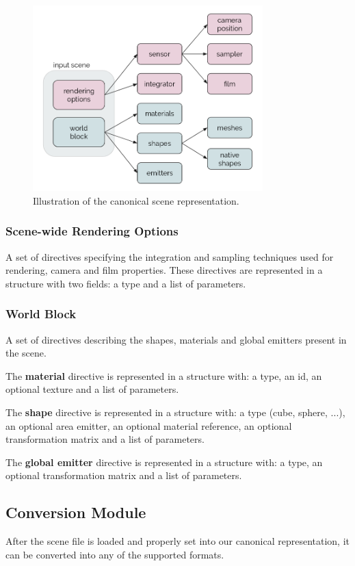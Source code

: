 \begin{figure}[h]
\centering
\includegraphics[width=3.5in]{figs/3_system_architecture/canonicalrep.png}
\caption{Illustration of the canonical scene representation.}
\label{fig:canonicalrep}
\end{figure}

\subsubsection{Scene-wide Rendering Options}
A set of directives specifying the integration and sampling techniques used for
rendering, camera and film properties. These directives are represented in a
structure with two fields: a type and a list of parameters.

\subsubsection{World Block}
A set of directives describing the shapes, materials and global emitters present
in the scene.

The \textbf{material} directive is represented in a structure with: a type, an
id, an optional texture and a list of parameters.

The \textbf{shape} directive is represented in a structure with: a type (cube,
sphere, ...), an optional area emitter, an optional material reference, an
optional transformation matrix and a list of parameters.


The \textbf{global emitter} directive is represented in a structure with: a
type, an optional transformation matrix and a list of parameters.

\subsection{Conversion Module}
After the scene file is loaded and properly set into our canonical
representation, it can be converted into any of the supported formats.

